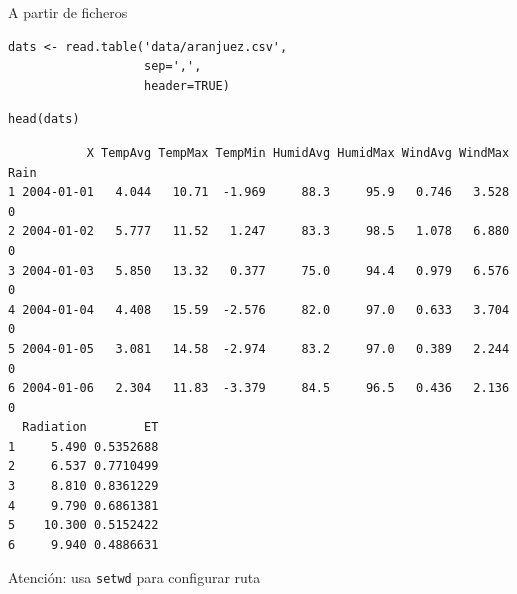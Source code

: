 \documentclass[aspectratio=169, usenames,svgnames,dvipsnames]{beamer}
\begin{document}
\begin{frame}[label={sec:orgf869fd8},fragile]{A partir de ficheros}
 \lstset{language=r,label= ,caption= ,captionpos=b,numbers=none}
\begin{lstlisting}
dats <- read.table('data/aranjuez.csv',
                   sep=',',
                   header=TRUE)
\end{lstlisting}

\lstset{language=r,label= ,caption= ,captionpos=b,numbers=none}
\begin{lstlisting}
head(dats)
\end{lstlisting}

\begin{verbatim}
           X TempAvg TempMax TempMin HumidAvg HumidMax WindAvg WindMax Rain
1 2004-01-01   4.044   10.71  -1.969     88.3     95.9   0.746   3.528    0
2 2004-01-02   5.777   11.52   1.247     83.3     98.5   1.078   6.880    0
3 2004-01-03   5.850   13.32   0.377     75.0     94.4   0.979   6.576    0
4 2004-01-04   4.408   15.59  -2.576     82.0     97.0   0.633   3.704    0
5 2004-01-05   3.081   14.58  -2.974     83.2     97.0   0.389   2.244    0
6 2004-01-06   2.304   11.83  -3.379     84.5     96.5   0.436   2.136    0
  Radiation        ET
1     5.490 0.5352688
2     6.537 0.7710499
3     8.810 0.8361229
4     9.790 0.6861381
5    10.300 0.5152422
6     9.940 0.4886631
\end{verbatim}

\alert{Atención: usa \texttt{setwd} para configurar ruta}
\end{frame}
\end{document}
